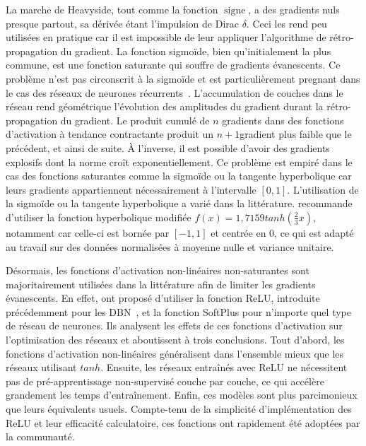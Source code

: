 La marche de Heavyside, tout comme la fonction $\operatorname{signe}$, a des gradients nuls presque partout, sa dérivée étant l'impulsion de Dirac $\delta$. Ceci les rend peu utilisées en pratique car il est impossible de leur appliquer l'algorithme de rétro-propagation du gradient.
La fonction sigmoïde, bien qu'initialement la plus commune, est une fonction saturante qui souffre de gradients évanescents. Ce problème n'est pas circonscrit à la sigmoïde et est particulièrement pregnant dans le cas des réseaux de neurones récurrents~\cite{hochreiter_gradient_2001}. L'accumulation de couches dans le réseau rend géométrique l'évolution des amplitudes du gradient durant la rétro-propagation du gradient. Le produit cumulé de $n$ gradients dans des fonctions d'activation à tendance contractante produit un $n+1$\ieme gradient plus faible que le précédent, et ainsi de suite. À l'inverse, il est possible d'avoir des gradients explosifs dont la norme croît exponentiellement. Ce problème est empiré dans le cas des fonctions saturantes comme la sigmoïde ou la tangente hyperbolique car leurs gradients appartiennent nécessairement à l'intervalle $[0,1]$. L'utilisation de la sigmoïde ou la tangente hyperbolique a varié dans la littérature. \citet{lecun_efficient_1998} recommande d'utiliser la fonction hyperbolique modifiée $f(x) = 1,7159 tanh(\frac{2}{3} x)$, notamment car celle-ci est bornée par $[-1,1]$ et centrée en 0, ce qui est adapté au travail sur des données normalisées à moyenne nulle et variance unitaire.

Désormais, les fonctions d'activation non-linéaires non-saturantes sont majoritairement utilisées dans la littérature afin de limiter les gradients évanescents. En effet, \citet{glorot_deep_2011} ont proposé d'utiliser la fonction \gls{ReLU}, introduite précédemment pour les \gls{DBN}~\cite{nair_rectified_2010}, et la fonction SoftPlus pour n'importe quel type de réseau de neurones. Ils analysent les effets de ces fonctions d'activation sur l'optimisation des réseaux et aboutissent à trois conclusions. Tout d'abord, les fonctions d'activation non-linéaires généralisent dans l'ensemble mieux que les réseaux utilisant $tanh$. Ensuite, les réseaux entraînés avec \gls{ReLU} ne nécessitent pas de pré-apprentissage non-supervisé couche par couche, ce qui accélère grandement les temps d'entraînement. Enfin, ces modèles sont plus parcimonieux que leurs équivalents usuels. Compte-tenu de la simplicité d'implémentation des \gls{ReLU} et leur efficacité calculatoire, ces fonctions ont rapidement été adoptées par la communauté.

